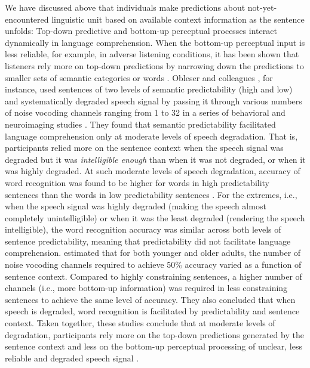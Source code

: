 \documentclass[a4paper, nobind]{templates/ociamthesis}
\begin{document}
We have discussed above that individuals make predictions about not-yet-encountered linguistic unit based on available context information as the sentence unfolds:
Top-down predictive and bottom-up perceptual processes interact dynamically in language comprehension.
When the bottom-up perceptual input is less reliable, for example, in adverse listening conditions, it has been shown that listeners rely more on top-down predictions by narrowing down the predictions to smaller sets of semantic categories or words \autocites[e.g.,][]{Strauss2013}[see also][]{Corps2020}.
Obleser and colleagues \autocite{Obleser2007,Obleser2010,Obleser2011}, for instance, used sentences of two levels of semantic predictability (high and low) and systematically degraded speech signal by passing it through various numbers of noise vocoding channels ranging from 1 to 32 in a series of behavioral and neuroimaging studies \autocite[see also][]{Hunter2018}.
They found that semantic predictability facilitated language comprehension only at moderate levels of speech degradation.
That is, participants relied more on the sentence context when the speech signal was degraded but it was \emph{intelligible enough} than when it was not degraded, or when it was highly degraded.
At such moderate levels of speech degradation, accuracy of word recognition was found to be higher for words in high predictability sentences than the words in low predictability sentences \autocite{Obleser2010}.
For the extremes, i.e., when the speech signal was highly degraded (making the speech almost completely unintelligible) or when it was the least degraded (rendering the speech intelligible),
the word recognition accuracy was similar across both levels of sentence predictability, meaning that predictability did not facilitate language comprehension.
\textcite{Sheldon2008b} estimated that for both younger and older adults, the number of noise vocoding channels required to achieve 50\% accuracy varied as a function of sentence context.
Compared to highly constraining sentences, a higher number of channels (i.e., more bottom-up information) was required in less constraining sentences to achieve the same level of accuracy.
They also concluded that when speech is degraded, word recognition is facilitated by predictability and sentence context.
Taken together, these studies conclude that at moderate levels of degradation, participants rely more on the top-down predictions generated by the sentence context and less on the bottom-up perceptual processing of unclear, less reliable and degraded speech signal \autocite{Obleser2014}.
\end{document}
